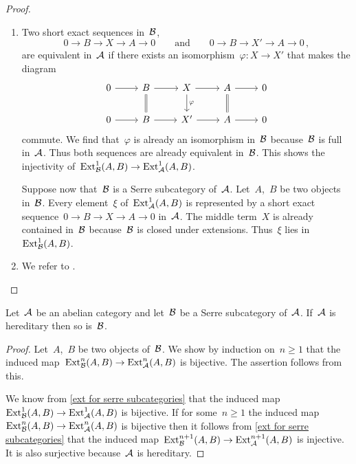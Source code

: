 \documentclass[a4paper, 11pt, twoside=semi]{scrartcl}
\begin{document}
\begin{proof}
  \leavevmode
  \begin{enumerate}
    \item
      Two short exact sequences in~$\mathcal{B}$,
      \[
        0 \to B \to X \to A \to 0
        \qquad\text{and}\qquad
        0 \to B \to X' \to A \to 0 \,,
      \]
      are equivalent in~$\mathcal{A}$ if there exists an isomorphism~$\varphi \colon X \to X'$ that makes the diagram
      \[
        \begin{tikzcd}
            0
            \arrow{r}
          &
            B
            \arrow{r}
            \arrow[equal]{d}
          &
            X
            \arrow{r}
            \arrow{d}[right]{\varphi}
          &
            A
            \arrow{r}
            \arrow[equal]{d}
          &
            0
          \\
            0
            \arrow{r}
          &
            B
            \arrow{r}
          &
            X'
            \arrow{r}
          &
            A
            \arrow{r}
          &
            0
        \end{tikzcd}
      \]
      commute.
      We find that~$\varphi$ is already an isomorphism in~$\mathcal{B}$ because~$\mathcal{B}$ is full in~$\mathcal{A}$.
      Thus both sequences are already equivalent in~$\mathcal{B}$.
      This shows the injectivity of~$\operatorname{Ext}^1_{\mathcal{B}}(A,B) \to \operatorname{Ext}^1_{\mathcal{A}}(A,B)$.

      Suppose now that~$\mathcal{B}$ is a Serre subcategory of~$\mathcal{A}$.
      Let~$A$,~$B$ be two objects in~$\mathcal{B}$.
      Every element~$\xi$ of~$\operatorname{Ext}^1_{\mathcal{A}}(A,B)$ is represented by a short exact sequence~$0 \to B \to X \to A \to 0$ in~$\mathcal{A}$.
      The middle term~$X$ is already contained in~$\mathcal{B}$ because~$\mathcal{B}$ is closed under extensions.
      Thus~$\xi$ lies in~$\operatorname{Ext}^1_{\mathcal{B}}(A,B)$.
    \item
      We refer to \cite[Proposition~3.3]{yoneda_ext}.
    \qedhere
  \end{enumerate}
\end{proof}

\begin{corollary}
  \label{serre subcategories are again hereditary}
  Let~$\mathcal{A}$ be an abelian category and let~$\mathcal{B}$ be a Serre subcategory of~$\mathcal{A}$.
  If~$\mathcal{A}$ is hereditary then so is~$\mathcal{B}$.
\end{corollary}

\begin{proof}
  Let~$A$,~$B$ be two objects of~$\mathcal{B}$.
  We show by induction on~$n \geq 1$ that the induced map~$\operatorname{Ext}^n_{\mathcal{B}}(A,B) \to \operatorname{Ext}^n_{\mathcal{A}}(A,B)$ is bijective.
  The assertion follows from this.

  We know from \cref{ext for serre subcategories} that the induced map~$\operatorname{Ext}^1_{\mathcal{B}}(A,B) \to \operatorname{Ext}^1_{\mathcal{A}}(A,B)$ is bijective.
  If for some~$n \geq 1$ the induced map~$\operatorname{Ext}^n_{\mathcal{B}}(A,B) \to \operatorname{Ext}^n_{\mathcal{A}}(A,B)$ is bijective then it follows from \cref{ext for serre subcategories} that the induced map~$\operatorname{Ext}^{n+1}_{\mathcal{B}}(A,B) \to \operatorname{Ext}^{n+1}_{\mathcal{A}}(A,B)$ is injective.
  It is also surjective because~$\mathcal{A}$ is hereditary.
\end{proof}
\end{document}
